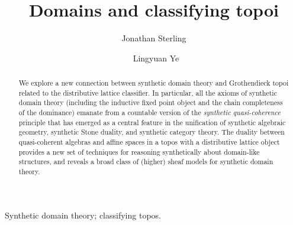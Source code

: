 \documentclass{msc}
\theoremstyle{theormstyle}
\theoremstyle{remarkstyle}
\begin{document}



\title{Domains and classifying topoi}

\begin{authgrp}
\author{Jonathan Sterling}
\end{authgrp}

\begin{authgrp}
\author{\ Lingyuan Ye}
\end{authgrp}


\begin{abstract}
  We explore a new connection between synthetic domain theory and Grothendieck topoi related to the distributive lattice classifier. In particular, all the axioms of synthetic domain theory (including the inductive fixed point object and the chain completeness of the dominance) emanate from a countable version of the \emph{synthetic quasi-coherence} principle that has emerged as a central feature in the unification of synthetic algebraic geometry, synthetic Stone duality, and synthetic category theory. The duality between quasi-coherent algebras and affine spaces in a topos with a distributive lattice object provides a new set of techniques for reasoning synthetically about domain-like structures, and reveals a broad class of (higher) sheaf models for synthetic domain theory. 
\end{abstract}

\begin{keywords}
  Synthetic domain theory; classifying topos.
\end{keywords}

\maketitle
\end{document}
